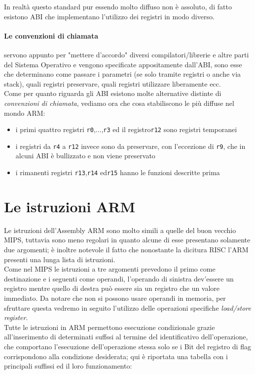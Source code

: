 \documentclass[class=book, crop=false]{standalone}
\begin{document}
In realtà questo standard pur essendo molto diffuso non è assoluto, di fatto esistono ABI che implementano l'utilizzo dei registri in modo diverso.\\

\paragraph{Le convenzioni di chiamata} servono appunto per "mettere d'accordo" diversi compilatori/librerie e altre parti del Sistema Operativo e vengono specificate appositamente dall'ABI, sono esse che determinano come passare i parametri (se solo tramite registri o anche via stack), quali registri preservare, quali registri utilizzare liberamente ecc.\\
Come per quanto riguarda gli ABI esistono molte alternative distinte di \emph{convenzioni di chiamata}, vediamo ora che cosa stabiliscono le più diffuse nel mondo ARM:

\begin{itemize}[nolistsep]
	\item i primi quattro registri \texttt{r0},...,\texttt{r3} ed il registro\texttt{r12} sono registri temporanei
	\item i registri da \texttt{r4} a \texttt{r12} invece sono da preservare, con l'eccezione di \texttt{r9}, che in alcuni ABI è bullizzato e non viene preservato
	\item i rimanenti registri \texttt{r13},\texttt{r14} ed\texttt{r15} hanno le funzioni descritte prima
\end{itemize}

\section{Le istruzioni ARM}
Le istruzioni dell'Assembly ARM sono molto simili a quelle del buon vecchio MIPS, tuttavia sono meno regolari in quanto alcune di esse presentano solamente due argomenti; è inoltre notevole il fatto che nonostante la dicitura RISC l'ARM presenti una lunga lista di istruzioni.\\
Come nel MIPS le istruzioni a tre argomenti prevedono il primo come destinazione e i seguenti come operandi, l'operando di sinistra dev'essere un registro mentre quello di destra può essere sia un registro che un valore immediato. Da notare che non si possono usare operandi in memoria, per sfruttare questa vedremo in seguito l'utilizzo delle operazioni specifiche \emph{load/store register}.\\
Tutte le istruzioni in ARM permettono esecuzione condizionale grazie all'inserimento di determinati suffssi al termine del identificativo dell'operazione, che comportano l'esecuzione dell'operazione stessa solo se i Bit del registro di flag corrispondono alla condizione desiderata; qui è riportata una tabella con i principali suffissi ed il loro funzionamento:\\
\end{document}

